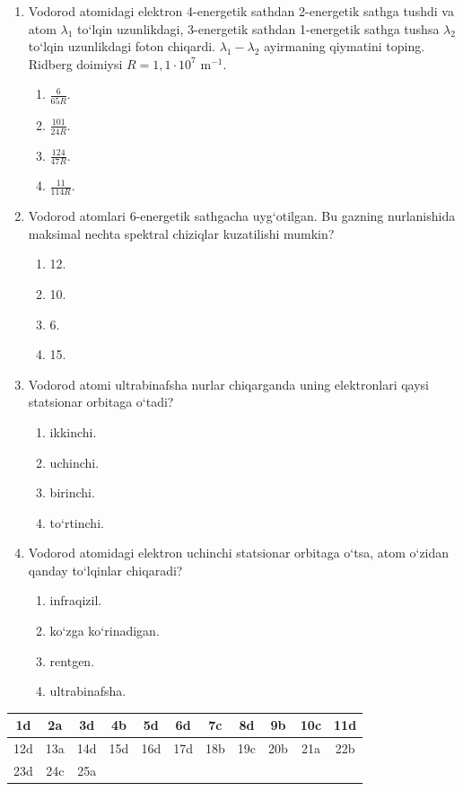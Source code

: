 \begin{enumerate}
\item Vodorod atomidagi elektron 4-energetik sathdan 2-energetik sathga tushdi va atom $\lambda_1$ to‘lqin uzunlikdagi, 3-energetik sathdan 1-energetik sathga tushsa $\lambda_2$ to‘lqin uzunlikdagi foton chiqardi. $\lambda_1 - \lambda_2$ ayirmaning qiymatini toping. Ridberg doimiysi $R=1,1\cdot 10^7\text{ m}^{-1}$.
\begin{enumerate}[label=\Alph*)]
\item $\frac{6}{65R}$.
\item $\frac{101}{24R}$.
\item $\frac{124}{47R}$.
\item $\frac{11}{114R}$.
\end{enumerate}

\item Vodorod atomlari 6-energetik sathgacha uyg‘otilgan. Bu gazning nurlanishida maksimal nechta spektral chiziqlar kuzatilishi mumkin?
\begin{enumerate}[label=\Alph*)]
\item 12.
\item 10.
\item 6.
\item 15.
\end{enumerate}

\item Vodorod atomi ultrabinafsha nurlar chiqarganda uning elektronlari qaysi statsionar orbitaga o‘tadi?
\begin{enumerate}[label=\Alph*)]
\item ikkinchi.
\item uchinchi.
\item birinchi.
\item to‘rtinchi.
\end{enumerate}

\item Vodorod atomidagi elektron uchinchi statsionar orbitaga o‘tsa, atom o‘zidan qanday to‘lqinlar chiqaradi?
\begin{enumerate}[label=\Alph*)]
\item infraqizil.
\item ko‘zga ko‘rinadigan.
\item rentgen.
\item ultrabinafsha.
\end{enumerate}

\end{enumerate}



\begin{table}[!ht]
\centering
\begin{tabular}{|c|c|c|c|c|c|c|c|c|c|c|}
\hline
1d & 2a & 3d & 4b & 5d & 6d & 7c & 8d & 9b & 10c & 11d \\ \hline
12d & 13a & 14d & 15d & 16d & 17d & 18b & 19c & 20b & 21a & 22b \\ \hline
23d & 24c & 25a & & & & & & & & \\ \hline
\end{tabular}
\end{table}
